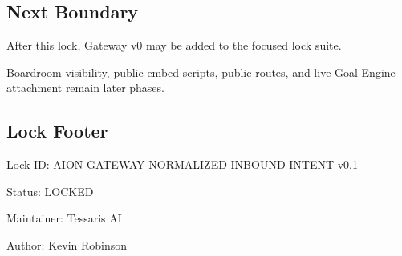 \subsection{Next Boundary}

After this lock, Gateway v0 may be added to the focused lock suite.

Boardroom visibility, public embed scripts, public routes, and live Goal Engine attachment remain later phases.

\subsection{Lock Footer}

Lock ID: AION-GATEWAY-NORMALIZED-INBOUND-INTENT-v0.1

Status: LOCKED

Maintainer: Tessaris AI

Author: Kevin Robinson
